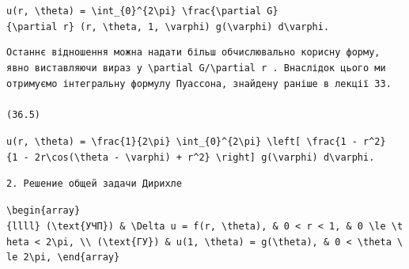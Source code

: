 \documentclass[
  ukrainian,
]{article}
\begin{document}
\texttt{u(r,\ \textbackslash{}theta)\ =\ \textbackslash{}int\_\{0\}\^{}\{2\textbackslash{}pi\}\ \textbackslash{}frac\{\textbackslash{}partial\ G\}\{\textbackslash{}partial\ r\}\ (r,\ \textbackslash{}theta,\ 1,\ \textbackslash{}varphi)\ g(\textbackslash{}varphi)\ d\textbackslash{}varphi.}

\begin{verbatim}
Останнє відношення можна надати більш обчислювально корисну форму, явно виставляючи вираз у \partial G/\partial r . Внаслідок цього ми отримуємо інтегральну формулу Пуассона, знайдену раніше в лекції 33.

(36.5)
\end{verbatim}

\texttt{u(r,\ \textbackslash{}theta)\ =\ \textbackslash{}frac\{1\}\{2\textbackslash{}pi\}\ \textbackslash{}int\_\{0\}\^{}\{2\textbackslash{}pi\}\ \textbackslash{}left{[}\ \textbackslash{}frac\{1\ -\ r\^{}2\}\{1\ -\ 2r\textbackslash{}cos(\textbackslash{}theta\ -\ \textbackslash{}varphi)\ +\ r\^{}2\}\ \textbackslash{}right{]}\ g(\textbackslash{}varphi)\ d\textbackslash{}varphi.}

\begin{verbatim}
2. Решение общей задачи Дирихле
\end{verbatim}

\texttt{\textbackslash{}begin\{array\}\{llll\}\ (\textbackslash{}text\{УЧП\})\ \&\ \textbackslash{}Delta\ u\ =\ f(r,\ \textbackslash{}theta),\ \&\ 0\ \textless{}\ r\ \textless{}\ 1,\ \&\ 0\ \textbackslash{}le\ \textbackslash{}theta\ \textless{}\ 2\textbackslash{}pi,\ \textbackslash{}\textbackslash{}\ (\textbackslash{}text\{ГУ\})\ \&\ u(1,\ \textbackslash{}theta)\ =\ g(\textbackslash{}theta),\ \&\ 0\ \textless{}\ \textbackslash{}theta\ \textbackslash{}le\ 2\textbackslash{}pi,\ \textbackslash{}end\{array\}}
\end{document}
